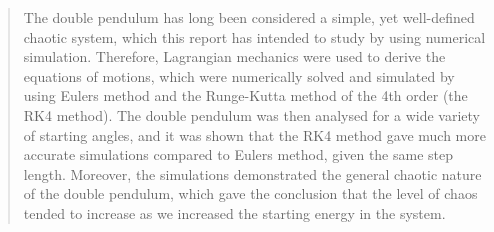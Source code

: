 \begin{abstract} 
    The double pendulum has long been considered a simple, yet well-defined chaotic system, which this report has intended to study by using numerical simulation. Therefore, Lagrangian mechanics were used to derive the equations of motions, which were numerically solved and simulated by using Eulers method and the Runge-Kutta method of the 4th order (the RK4 method). The double pendulum was then analysed for a wide variety of starting angles, and it was shown that the RK4 method gave much more accurate simulations compared to Eulers method, given the same step length. Moreover, the simulations demonstrated the general chaotic nature of the double pendulum, which gave the conclusion that the level of chaos tended to increase as we increased the starting energy in the system.     
    

\end{abstract}